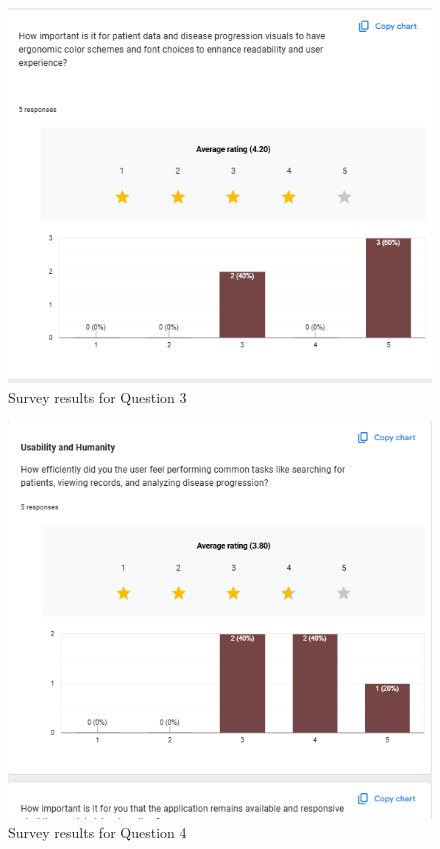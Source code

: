 \documentclass[12pt, titlepage]{article}
\begin{document}
  \begin{figure}[ht!]
    \centering
    \includegraphics[scale=1.1]{../assets/s3.png}
    \caption{Survey results for Question 3}
    \label{fig:survey3}
  \end{figure}
  \begin{figure}[ht!]
    \centering
    \includegraphics[scale=1.1]{../assets/s4.png}
    \caption{Survey results for Question 4}
    \label{fig:survey4}
  \end{figure}
  
\end{document}
